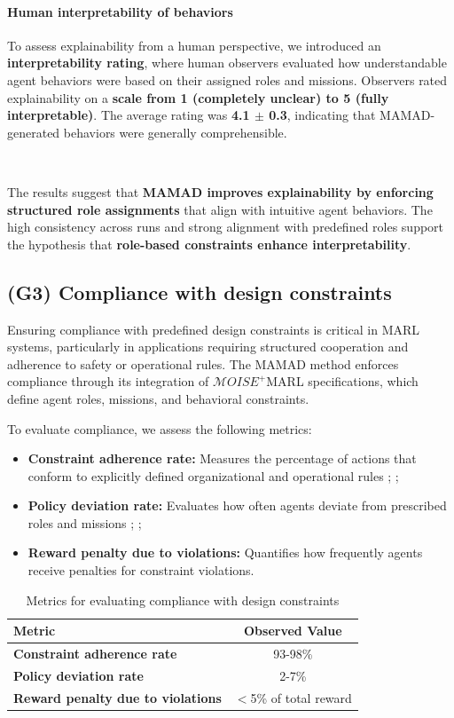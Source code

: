 \documentclass[pdflatex,sn-mathphys-num]{sn-jnl}%
\theoremstyle{thmstyleone}%
\theoremstyle{thmstyletwo}%
\theoremstyle{thmstylethree}%
\begin{document}
\paragraph{Human interpretability of behaviors}
To assess explainability from a human perspective, we introduced an \textbf{interpretability rating}, where human observers evaluated how understandable agent behaviors were based on their assigned roles and missions. Observers rated explainability on a \textbf{scale from 1 (completely unclear) to 5 (fully interpretable)}. The average rating was \textbf{4.1 $\pm$ 0.3}, indicating that MAMAD-generated behaviors were generally comprehensible.

\

The results suggest that \textbf{MAMAD improves explainability by enforcing structured role assignments} that align with intuitive agent behaviors. The high consistency across runs and strong alignment with predefined roles support the hypothesis that \textbf{role-based constraints enhance interpretability}.


\subsection{(G3) Compliance with design constraints}

Ensuring compliance with predefined design constraints is critical in MARL systems, particularly in applications requiring structured cooperation and adherence to safety or operational rules. The MAMAD method enforces compliance through its integration of $\mathcal{M}OISE^+$MARL specifications, which define agent roles, missions, and behavioral constraints. 

To evaluate compliance, we assess the following metrics:

\begin{itemize}
    \item \textbf{Constraint adherence rate:} Measures the percentage of actions that conform to explicitly defined organizational and operational rules ; ;
    \item \textbf{Policy deviation rate:} Evaluates how often agents deviate from prescribed roles and missions ; ;
    \item \textbf{Reward penalty due to violations:} Quantifies how frequently agents receive penalties for constraint violations.
\end{itemize}

\begin{table}[h!]
    \centering
    \caption{Metrics for evaluating compliance with design constraints}
    \begin{tabular}{|l|c|}
        \hline
        \textbf{Metric} & \textbf{Observed Value} \\
        \hline
        \textbf{Constraint adherence rate} & 93-98\% \\
        \hline
        \textbf{Policy deviation rate} & 2-7\% \\
        \hline
        \textbf{Reward penalty due to violations} & $<$5\% of total reward \\
        \hline
    \end{tabular}
    \label{tab:compliance}
\end{table}
\end{document}
